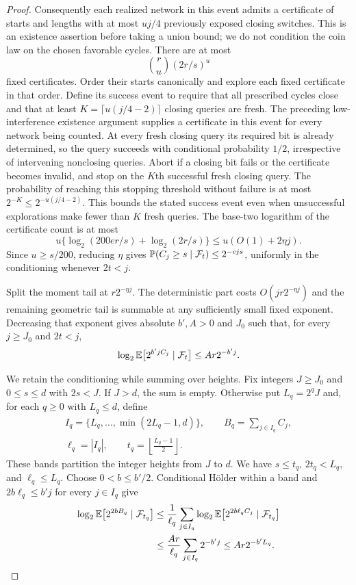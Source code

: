 \begin{proof}
Consequently each realized network in this event admits a certificate of starts and lengths with at most $uj/4$ previously exposed closing switches. This is an existence assertion before taking a union bound; we do not condition the coin law on the chosen favorable cycles. There are at most
\[
 \binom ru(2r/s)^u
\]
fixed certificates. Order their starts canonically and explore each fixed certificate in that order. Define its success event to require that all prescribed cycles close and that at least $K=\lceil u(j/4-2)\rceil$ closing queries are fresh. The preceding low-interference existence argument supplies a certificate in this event for every network being counted. At every fresh closing query its required bit is already determined, so the query succeeds with conditional probability $1/2$, irrespective of intervening nonclosing queries. Abort if a closing bit fails or the certificate becomes invalid, and stop on the $K$th successful fresh closing query. The probability of reaching this stopping threshold without failure is at most $2^{-K}\le2^{-u(j/4-2)}$. This bounds the stated success event even when unsuccessful explorations make fewer than $K$ fresh queries. The base-two logarithm of the certificate count is at most
\[
 u\{\log_2(200er/s)+\log_2(2r/s)\}\le u(O(1)+2\eta j).
\]
Since $u\ge s/200$, reducing $\eta$ gives
$\mathbb P(C_j\ge s\mid\mathcal F_t)\le2^{-cjs}$, uniformly in the
conditioning whenever $2t<j$.

Split the moment tail at $r2^{-\eta j}$. The deterministic part costs
$O(jr2^{-\eta j})$ and the remaining geometric tail is summable at
any sufficiently small fixed exponent. Decreasing that exponent
gives absolute $b',A>0$ and $J_0$ such that, for every $j\ge J_0$
and $2t<j$,
\begin{equation}\label{net:single-height-conditional}
 \log_2\mathbb E\bigl[2^{b'jC_j}\mid\mathcal F_t\bigr]
 \le Ar2^{-b'j}.
\end{equation}

We retain the conditioning while summing over heights. Fix integers
$J\ge J_0$ and $0\le s\le d$ with $2s<J$. If $J>d$, the
sum is empty. Otherwise put $L_q=2^qJ$ and, for each $q\ge0$
with $L_q\le d$, define
\begin{gather*}
 I_q=\{L_q,\ldots,\min(2L_q-1,d)\},\qquad
 B_q=\sum_{j\in I_q}C_j,\\
 \ell_q=|I_q|,\qquad
 t_q=\left\lfloor\frac{L_q-1}{2}\right\rfloor.
\end{gather*}
These bands partition the integer heights from $J$ to $d$.
We have $s\le t_q$, $2t_q<L_q$, and $\ell_q\le L_q$.
Choose $0<b\le b'/2$. Conditional H\"older within a band and
$2b\ell_q\le b'j$ for every $j\in I_q$ give
\begin{align*}
 \log_2\mathbb E\bigl[2^{2bB_q}\mid\mathcal F_{t_q}\bigr]
 &\le\frac1{\ell_q}\sum_{j\in I_q}
       \log_2\mathbb E\bigl[2^{2b\ell_q C_j}\mid\mathcal F_{t_q}\bigr]\\
 &\le\frac{Ar}{\ell_q}\sum_{j\in I_q}2^{-b'j}
 \le Ar2^{-b'L_q}.
\end{align*}


\end{proof}

